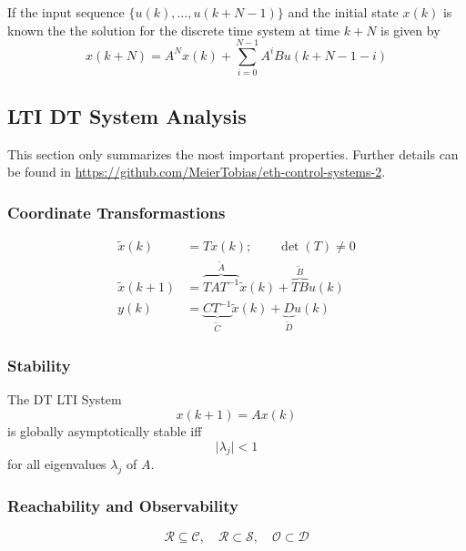 If the input sequence $\{u(k), \ldots, u(k+N-1)\}$ and the initial state $x(k)$ is known the the solution for the discrete time system at time $k+N$ is given by
\begin{equation*}
    x(k+N) = A^N x(k) + \sum_{i=0}^{N-1} A^i B u(k+N-1-i)
\end{equation*}


\subsection{LTI DT System Analysis}

This section only summarizes the most important properties. Further details can be found in {\small\url{https://github.com/MeierTobias/eth-control-systems-2}}.

\subsubsection{Coordinate Transformastions}

\begin{align*}
    \tilde{x}(k)   & = Tx(k); \qquad \det(T) \neq 0                                                    \\
    \tilde{x}(k+1) & = \overbrace{TAT^{-1}}^{\tilde{A}} \tilde{x}(k) + \overbrace{TB}^{\tilde{B}} u(k) \\
    y(k)           & = \underbrace{CT^{-1}}_{\tilde{C}} \tilde{x}(k) + \underbrace{D}_{\tilde{D}}u(k)
\end{align*}

\subsubsection{Stability}
The DT LTI System
\begin{equation*}
    x(k+1) = Ax(k)
\end{equation*}
is globally asymptotically stable iff
\begin{equation*}
    \lvert \lambda_j \rvert < 1
\end{equation*}
for all eigenvalues $\lambda_j$ of $A$.

\subsubsection{Reachability and Observability}
\noindent\begin{equation*}
    \mathcal{R} \subseteq \mathcal{C}, \quad \mathcal{R} \subset\mathcal{S}, \quad \mathcal{O} \subset \mathcal{D}
\end{equation*}


